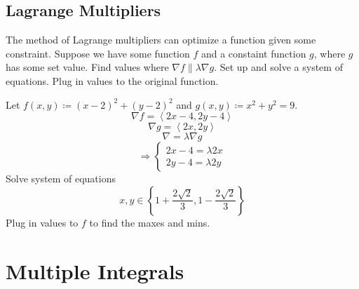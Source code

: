 \section{Lagrange Multipliers}
The method of Lagrange multipliers can optimize a function given some constraint. Suppose we have some function \(f\) and a constaint function \(g\), where \(g\) has some set value. Find values where \(\nabla f\parallel \lambda \nabla g\). Set up and solve a system of equations. Plug in values to the original function.
\begin{eg}
    Let \(f(x,y)\coloneqq (x-2)^2 +(y-2)^2\) and \(g(x,y)\coloneqq x^2 +y^2 =9\). 
    \[
        \nabla f=\left\langle 2x-4,2y-4 \right\rangle
    \]
    \[
        \nabla g=\left\langle 2x,2y \right\rangle 
    \]
    \[
        \nabla =\lambda \nabla g
    \]
    \[
        \Longrightarrow \left\{\begin{array}{c}
            2x-4=\lambda 2x\\
            2y-4=\lambda 2y
        \end{array}\right.
    \]
Solve system of equations
\[
    x,y\in\left\{ 1+\frac{2\sqrt{2} }{3},1-\frac{2\sqrt{2} }{3} \right\} 
\]
Plug in values to \(f\) to find the maxes and mins.
\end{eg}
\chapter{Multiple Integrals}
